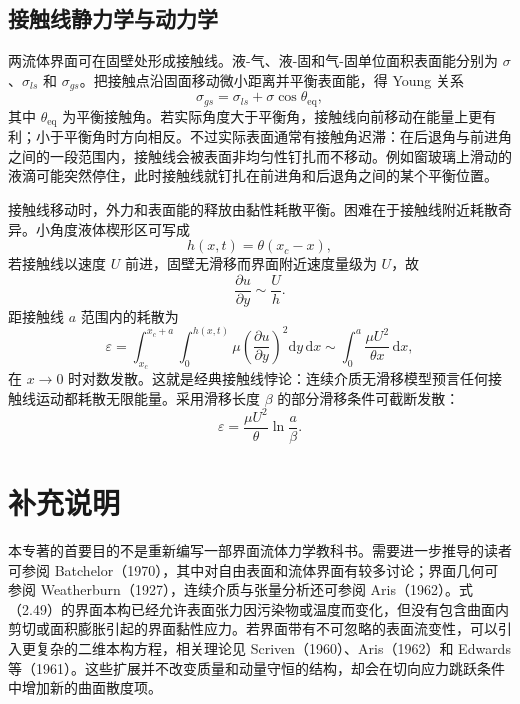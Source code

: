 \documentclass[11pt,a4paper,openany,fontset=none]{ctexbook}
\newenvironment{sourceblock}
  {\par\addvspace{0.65\baselineskip}\noindent\begin{minipage}{\linewidth}\centering}
  {\end{minipage}\par\addvspace{0.48\baselineskip}}
\begin{document}
\subsection{接触线静力学与动力学}


两流体界面可在固壁处形成接触线。液-气、液-固和气-固单位面积表面能分别为 $\sigma$、$\sigma_{ls}$ 和 $\sigma_{gs}$。把接触点沿固面移动微小距离并平衡表面能，得 Young 关系
\begin{equation}
 \sigma_{gs}=\sigma_{ls}+\sigma\cos\theta_{\mathrm{eq}}, \tag{2.76}
\end{equation}
其中 $\theta_{\mathrm{eq}}$ 为平衡接触角。若实际角度大于平衡角，接触线向前移动在能量上更有利；小于平衡角时方向相反。不过实际表面通常有接触角迟滞：在后退角与前进角之间的一段范围内，接触线会被表面非均匀性钉扎而不移动。例如窗玻璃上滑动的液滴可能突然停住，此时接触线就钉扎在前进角和后退角之间的某个平衡位置。

\begin{sourceblock}
\end{sourceblock}

接触线移动时，外力和表面能的释放由黏性耗散平衡。困难在于接触线附近耗散奇异。小角度液体楔形区可写成
\begin{equation}
 h(x,t)=\theta(x_c-x), \tag{2.77}
\end{equation}
若接触线以速度 $U$ 前进，固壁无滑移而界面附近速度量级为 $U$，故
\begin{equation}
 \frac{\partial u}{\partial y}\sim\frac{U}{h}. \tag{2.78}
\end{equation}
距接触线 $a$ 范围内的耗散为
\begin{equation}
 \varepsilon=\int_{x_c}^{x_c+a}\int_0^{h(x,t)}\mu\left(\frac{\partial u}{\partial y}\right)^2\mathrm dy\,\mathrm dx
 \sim\int_0^a\frac{\mu U^2}{\theta x}\,\mathrm dx, \tag{2.79--2.80}
\end{equation}
在 $x\to0$ 时对数发散。这就是经典接触线悖论：连续介质无滑移模型预言任何接触线运动都耗散无限能量。采用滑移长度 $\beta$ 的部分滑移条件可截断发散：
\begin{equation}
 \varepsilon=\frac{\mu U^2}{\theta}\ln\frac{a}{\beta}. \tag{2.81}
\end{equation}

\section{补充说明}

本专著的首要目的不是重新编写一部界面流体力学教科书。需要进一步推导的读者可参阅 Batchelor（1970），其中对自由表面和流体界面有较多讨论；界面几何可参阅 Weatherburn（1927），连续介质与张量分析还可参阅 Aris（1962）。式（2.49）的界面本构已经允许表面张力因污染物或温度而变化，但没有包含曲面内剪切或面积膨胀引起的界面黏性应力。若界面带有不可忽略的表面流变性，可以引入更复杂的二维本构方程，相关理论见 Scriven（1960）、Aris（1962）和 Edwards 等（1961）。这些扩展并不改变质量和动量守恒的结构，却会在切向应力跳跃条件中增加新的曲面散度项。
\end{document}
